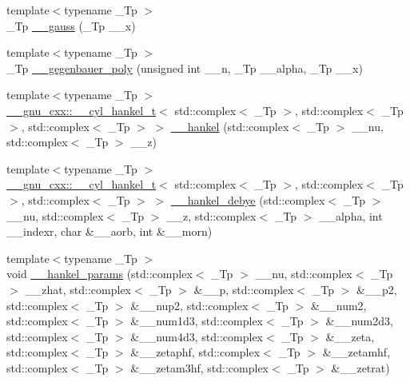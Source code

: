 \begin{DoxyCompactItemize}
{\footnotesize template$<$typename \+\_\+\+Tp $>$ }\\\+\_\+\+Tp \hyperlink{namespacestd_1_1____detail_afdb25beb2328b74d64d9be03de64c442}{\+\_\+\+\_\+gauss} (\+\_\+\+Tp \+\_\+\+\_\+x)
\item 
{\footnotesize template$<$typename \+\_\+\+Tp $>$ }\\\+\_\+\+Tp \hyperlink{namespacestd_1_1____detail_a5c2319a50d89d8067a46750708bf8563}{\+\_\+\+\_\+gegenbauer\+\_\+poly} (unsigned int \+\_\+\+\_\+n, \+\_\+\+Tp \+\_\+\+\_\+alpha, \+\_\+\+Tp \+\_\+\+\_\+x)
\item 
{\footnotesize template$<$typename \+\_\+\+Tp $>$ }\\\hyperlink{struct____gnu__cxx_1_1____cyl__hankel__t}{\+\_\+\+\_\+gnu\+\_\+cxx\+::\+\_\+\+\_\+cyl\+\_\+hankel\+\_\+t}$<$ std\+::complex$<$ \+\_\+\+Tp $>$, std\+::complex$<$ \+\_\+\+Tp $>$, std\+::complex$<$ \+\_\+\+Tp $>$ $>$ \hyperlink{namespacestd_1_1____detail_a0346301fb5eb7faa659064335675f8c6}{\+\_\+\+\_\+hankel} (std\+::complex$<$ \+\_\+\+Tp $>$ \+\_\+\+\_\+nu, std\+::complex$<$ \+\_\+\+Tp $>$ \+\_\+\+\_\+z)
\item 
{\footnotesize template$<$typename \+\_\+\+Tp $>$ }\\\hyperlink{struct____gnu__cxx_1_1____cyl__hankel__t}{\+\_\+\+\_\+gnu\+\_\+cxx\+::\+\_\+\+\_\+cyl\+\_\+hankel\+\_\+t}$<$ std\+::complex$<$ \+\_\+\+Tp $>$, std\+::complex$<$ \+\_\+\+Tp $>$, std\+::complex$<$ \+\_\+\+Tp $>$ $>$ \hyperlink{namespacestd_1_1____detail_a4051efdcdf6d1ab4a4b26c1c9f6752b6}{\+\_\+\+\_\+hankel\+\_\+debye} (std\+::complex$<$ \+\_\+\+Tp $>$ \+\_\+\+\_\+nu, std\+::complex$<$ \+\_\+\+Tp $>$ \+\_\+\+\_\+z, std\+::complex$<$ \+\_\+\+Tp $>$ \+\_\+\+\_\+alpha, int \+\_\+\+\_\+indexr, char \&\+\_\+\+\_\+aorb, int \&\+\_\+\+\_\+morn)
\item 
{\footnotesize template$<$typename \+\_\+\+Tp $>$ }\\void \hyperlink{namespacestd_1_1____detail_aff42671a79cd3852a57752f79c82f8da}{\+\_\+\+\_\+hankel\+\_\+params} (std\+::complex$<$ \+\_\+\+Tp $>$ \+\_\+\+\_\+nu, std\+::complex$<$ \+\_\+\+Tp $>$ \+\_\+\+\_\+zhat, std\+::complex$<$ \+\_\+\+Tp $>$ \&\+\_\+\+\_\+p, std\+::complex$<$ \+\_\+\+Tp $>$ \&\+\_\+\+\_\+p2, std\+::complex$<$ \+\_\+\+Tp $>$ \&\+\_\+\+\_\+nup2, std\+::complex$<$ \+\_\+\+Tp $>$ \&\+\_\+\+\_\+num2, std\+::complex$<$ \+\_\+\+Tp $>$ \&\+\_\+\+\_\+num1d3, std\+::complex$<$ \+\_\+\+Tp $>$ \&\+\_\+\+\_\+num2d3, std\+::complex$<$ \+\_\+\+Tp $>$ \&\+\_\+\+\_\+num4d3, std\+::complex$<$ \+\_\+\+Tp $>$ \&\+\_\+\+\_\+zeta, std\+::complex$<$ \+\_\+\+Tp $>$ \&\+\_\+\+\_\+zetaphf, std\+::complex$<$ \+\_\+\+Tp $>$ \&\+\_\+\+\_\+zetamhf, std\+::complex$<$ \+\_\+\+Tp $>$ \&\+\_\+\+\_\+zetam3hf, std\+::complex$<$ \+\_\+\+Tp $>$ \&\+\_\+\+\_\+zetrat)

\end{DoxyCompactItemize}
